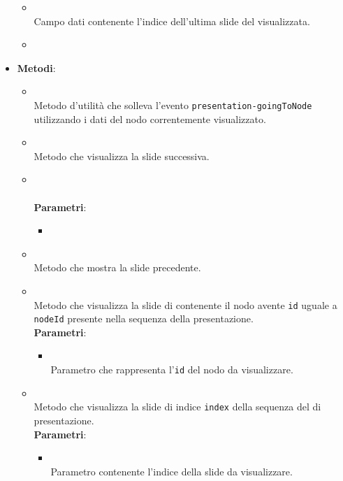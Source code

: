 \begin{itemize}
\begin{itemize}
\item {}
\\ Campo dati contenente l'indice dell'ultima slide del  visualizzata.
\item {}
\\ \dpScopeField
\end{itemize}
\item \textbf{Metodi}:
\begin{itemize}
\item {}
\\ Metodo d'utilità che solleva l'evento \texttt{presentation-goingToNode} utilizzando i dati del nodo correntemente visualizzato.
\item {}
\\ Metodo che visualizza la slide successiva.
\item {}
\\ \dpConstructor
\\ \textbf{Parametri}:
\begin{itemize}
\item {}
\\ \dpScopeParam
\end{itemize}
\item {}
\\ Metodo che mostra la slide precedente.
\item {}
\\ Metodo che visualizza la slide di contenente il nodo avente \texttt{id} uguale a \texttt{nodeId} presente nella sequenza della presentazione.
\\ \textbf{Parametri}:
\begin{itemize}
\item {}
\\ Parametro che rappresenta l'\texttt{id} del nodo da visualizzare.
\end{itemize}
\item {}
\\ Metodo che visualizza la slide di indice \texttt{index} della sequenza del  di presentazione.
\\ \textbf{Parametri}:
\begin{itemize}
\item {}
\\ Parametro contenente l'indice della slide da visualizzare.
\end{itemize}
\end{itemize}
\end{itemize}
